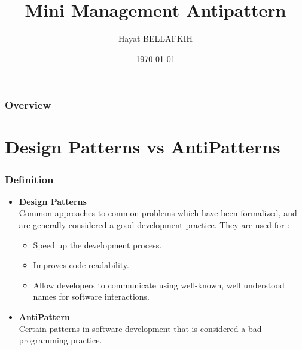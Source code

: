 \documentclass{beamer}
\title[Fear	of	Success]{Mini	Management	Antipattern} %
\author{Hayat BELLAFKIH} %
\institute[UMONS] %
{
University of Mons\\ %
\medskip
\textit{hayat.BELLAFKIH@student.umons.ac.be} %
}
\date{\today} %
\begin{document}
\begin{frame}
\titlepage %
\end{frame}

\begin{frame}
\frametitle{Overview} %
\tableofcontents %
\end{frame}


\section{Design Patterns vs AntiPatterns} %
\begin{frame}
\frametitle{Definition}
\begin{itemize}
\color{black}
\item \textbf{Design Patterns}\\
Common approaches to common problems which have been formalized, and are generally considered a good development practice. They are used for :\\
\begin{minipage}[t]{11cm}
\begin{itemize}
\item Speed up the development process.
\item Improves code readability.
\item Allow developers to communicate using well-known, well understood names for software interactions.
\end{itemize}
\end{minipage}
\newline
\item \textbf{AntiPattern}\\ 
Certain patterns in software development that is considered a bad programming practice.
\end{itemize}
\end{frame}
\end{document}
